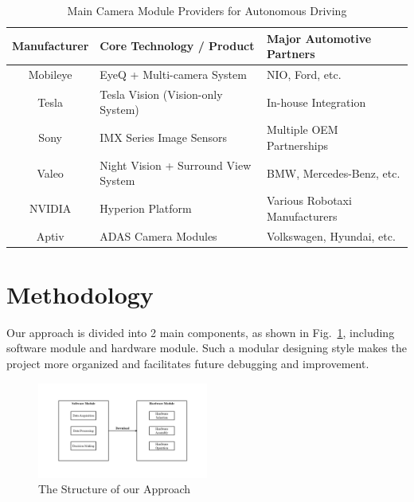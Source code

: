 \documentclass[journal,transmag]{IEEEtran}
\begin{document}
\begin{table}[t]
\centering
\caption{Main Camera Module Providers for Autonomous Driving}
\label{tab:Current_Market_Products}
\begin{tabular}{|c|p{6.5cm}|p{5.5cm}|}  
\hline
\textbf{Manufacturer} & \textbf{Core Technology / Product} & \textbf{Major Automotive Partners} \\
\hline
Mobileye & EyeQ + Multi-camera System & NIO, Ford, etc. \\
\hline
Tesla & Tesla Vision (Vision-only System) & In-house Integration \\
\hline
Sony & IMX Series Image Sensors & Multiple OEM Partnerships \\
\hline
Valeo & Night Vision + Surround View System & BMW, Mercedes-Benz, etc. \\
\hline
NVIDIA & Hyperion Platform & Various Robotaxi Manufacturers \\
\hline
Aptiv & ADAS Camera Modules & Volkswagen, Hyundai, etc. \\
\hline
\end{tabular}
\end{table}






\section{Methodology}
Our approach is divided into 2 main components, as shown in Fig.~\ref{fig:The Structure of our Approach}, including software module and hardware module. Such a modular designing style makes the project more organized and facilitates future debugging and improvement.

\begin{figure}[h]
    \centering
    \includegraphics[width=0.5\textwidth]{The Structure of our Approach.png} 
    \caption{The Structure of our Approach}
    \label{fig:The Structure of our Approach}
\end{figure}
\end{document}
